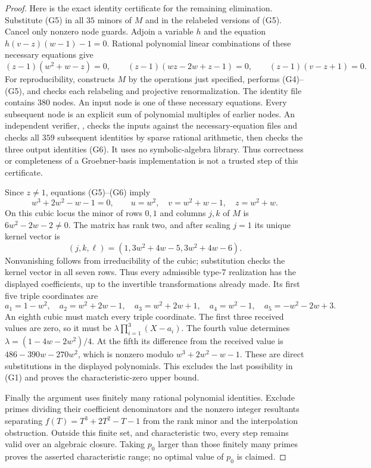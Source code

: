 \begin{proof}
Here is the exact identity certificate for the remaining elimination.
Substitute (G5) in all $35$ minors of $M$ and in the relabeled versions
of (G5).  Cancel only nonzero node guards.  Adjoin a variable $h$ and
the equation $h(v-z)(w-1)-1=0$.  Rational polynomial linear combinations
of these necessary equations give
\[
 (z-1)(w^2+w-z)=0,\qquad
 (z-1)(wz-2w+z-1)=0,\qquad
 (z-1)(v-z+1)=0.                              \tag{G6}
\]
For reproducibility,  constructs $M$ by the
operations just specified,  performs (G4)--(G5),
and  checks each relabeling and projective
renormalization.  The identity file
 contains $380$ nodes.
An input node is one of these necessary equations.  Every subsequent
node is an explicit sum of polynomial multiples of earlier nodes.
An independent verifier, ,
checks the inputs against the necessary-equation files and checks all
$359$ subsequent identities by sparse rational arithmetic, then checks
the three output identities (G6).  It uses no symbolic-algebra library.
Thus correctness or completeness of a Groebner-basis implementation is
not a trusted step of this certificate.

Since $z\ne1$, equations (G5)--(G6) imply
\[
 w^3+2w^2-w-1=0,\qquad u=w^2,\quad v=w^2+w-1,\quad z=w^2+w.
\]
On this cubic locus the minor of rows $0,1$ and columns $j,k$ of $M$
is $6w^2-2w-2\ne0$.  The matrix has rank two, and after scaling $j=1$
its unique kernel vector is
\[
 (j,k,\ell)=(1,3w^2+4w-5,3w^2+4w-6).
\]
Nonvanishing follows from irreducibility of the cubic; substitution
checks the kernel vector in all seven rows.  Thus every admissible
type-7 realization has the displayed coefficients, up to the invertible
transformations already made.  Its first five triple coordinates are
\[
 a_1=1-w^2,\quad a_2=w^2+2w-1,\quad a_3=w^2+2w+1,
 \quad a_4=w^2-1,\quad a_5=-w^2-2w+3.
\]
An eighth cubic must match every triple coordinate.  The first three
received values are zero, so it must be
$\lambda\prod_{i=1}^3(X-a_i)$.  The fourth value determines
$\lambda=(1-4w-2w^2)/4$.  At the fifth its difference from the received
value is $486-390w-270w^2$, which is nonzero modulo
$w^3+2w^2-w-1$.  These are direct substitutions in the displayed
polynomials.  This excludes the last possibility in (G1) and proves the
characteristic-zero upper bound.

Finally the argument uses finitely many rational polynomial identities.
Exclude primes dividing their coefficient denominators and the nonzero
integer resultants separating $f(T)=T^3+2T^2-T-1$ from the rank minor and the
interpolation obstruction.  Outside this finite set, and characteristic
two, every step remains valid over an algebraic closure.  Taking $p_0$
larger than those finitely many primes proves the asserted characteristic
range; no optimal value of $p_0$ is claimed.
\end{proof}
